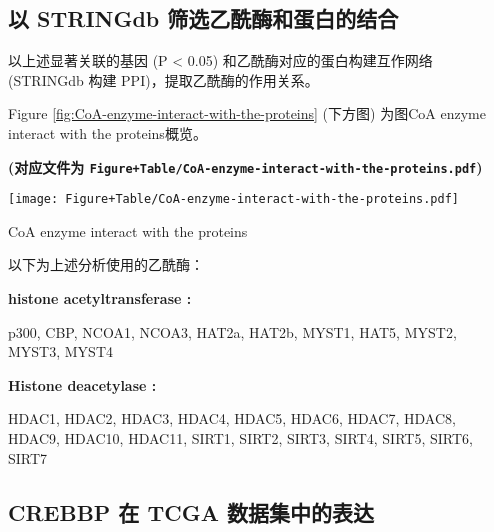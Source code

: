 \documentclass[
]{article}
\begin{document}
\hypertarget{ux4ee5-stringdb-ux7b5bux9009ux4e59ux9170ux9176ux548cux86cbux767dux7684ux7ed3ux5408}{%
\subsection{以 STRINGdb 筛选乙酰酶和蛋白的结合}\label{ux4ee5-stringdb-ux7b5bux9009ux4e59ux9170ux9176ux548cux86cbux767dux7684ux7ed3ux5408}}

以上述显著关联的基因 (P \textless{} 0.05) 和乙酰酶对应的蛋白构建互作网络 (STRINGdb 构建 PPI)，提取乙酰酶的作用关系。

Figure \ref{fig:CoA-enzyme-interact-with-the-proteins} (下方图) 为图CoA enzyme interact with the proteins概览。

\textbf{(对应文件为 \texttt{Figure+Table/CoA-enzyme-interact-with-the-proteins.pdf})}

\def\@captype{figure}
\begin{center}
\texttt{[image: Figure+Table/CoA-enzyme-interact-with-the-proteins.pdf]}
\caption{CoA enzyme interact with the proteins}\label{fig:CoA-enzyme-interact-with-the-proteins}
\end{center}

以下为上述分析使用的乙酰酶：

\begin{center}\begin{tcolorbox}[colback=gray!10, colframe=gray!50, width=0.9\linewidth, arc=1mm, boxrule=0.5pt]
\textbf{
histone acetyltransferase
:}

\vspace{0.5em}

    p300, CBP, NCOA1, NCOA3, HAT2a, HAT2b, MYST1, HAT5,
MYST2, MYST3, MYST4

\vspace{2em}


\textbf{
Histone deacetylase
:}

\vspace{0.5em}

    HDAC1, HDAC2, HDAC3, HDAC4, HDAC5, HDAC6, HDAC7, HDAC8,
HDAC9, HDAC10, HDAC11, SIRT1, SIRT2, SIRT3, SIRT4, SIRT5,
SIRT6, SIRT7

\vspace{2em}
\end{tcolorbox}
\end{center}

\hypertarget{crebbp-ux5728-tcga-ux6570ux636eux96c6ux4e2dux7684ux8868ux8fbe}{%
\subsection{CREBBP 在 TCGA 数据集中的表达}\label{crebbp-ux5728-tcga-ux6570ux636eux96c6ux4e2dux7684ux8868ux8fbe}}
\end{document}
